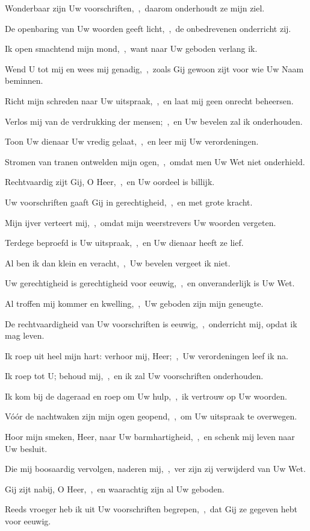 \documentclass[12pt,twoside,a5paper]{article}
\begin{document}
\begin{halfparskip}
   Wonderbaar zijn Uw voorschriften,~\sep\ daarom onderhoudt ze mijn ziel.

  De openbaring van Uw woorden geeft licht,~\sep\ de onbedrevenen onderricht zij.

  Ik open smachtend mijn mond,~\sep\ want naar Uw geboden verlang ik.

  Wend U tot mij en wees mij genadig,~\sep\ zoals Gij gewoon zijt voor wie Uw Naam beminnen.

  Richt mijn schreden naar Uw uitspraak,~\sep\ en laat mij geen onrecht beheersen.

  Verlos mij van de verdrukking der mensen;~\sep\ en Uw bevelen zal ik onderhouden.

  Toon Uw dienaar Uw vredig gelaat,~\sep\ en leer mij Uw verordeningen.

  Stromen van tranen ontwelden mijn ogen,~\sep\ omdat men Uw Wet niet onderhield.
\end{halfparskip}

\begin{halfparskip}
   Rechtvaardig zijt Gij, O Heer,~\sep\ en Uw oordeel is billijk.

  Uw voorschriften gaaft Gij in gerechtigheid,~\sep\ en met grote kracht.

  Mijn ijver verteert mij,~\sep\ omdat mijn weerstrevers Uw woorden vergeten.

  Terdege beproefd is Uw uitspraak,~\sep\ en Uw dienaar heeft ze lief.

  Al ben ik dan klein en veracht,~\sep\ Uw bevelen vergeet ik niet.

  Uw gerechtigheid is gerechtigheid voor eeuwig,~\sep\ en onveranderlijk is Uw Wet.

  Al troffen mij kommer en kwelling,~\sep\ Uw geboden zijn mijn geneugte.

  De rechtvaardigheid van Uw voorschriften is eeuwig,~\sep\ onderricht mij, opdat ik mag leven.
\end{halfparskip}

\begin{halfparskip}
   Ik roep uit heel mijn hart: verhoor mij, Heer;~\sep\ Uw verordeningen leef ik na.

  Ik roep tot U; behoud mij,~\sep\ en ik zal Uw voorschriften onderhouden.

  Ik kom bij de dageraad en roep om Uw hulp,~\sep\ ik vertrouw op Uw woorden.

  Vóór de nachtwaken zijn mijn ogen geopend,~\sep\ om Uw uitspraak te overwegen.

  Hoor mijn smeken, Heer, naar Uw barmhartigheid,~\sep\ en schenk mij leven naar Uw besluit.

  Die mij boosaardig vervolgen, naderen mij,~\sep\ ver zijn zij verwijderd van Uw Wet.

  Gij zijt nabij, O Heer,~\sep\ en waarachtig zijn al Uw geboden.

  Reeds vroeger heb ik uit Uw voorschriften begrepen,~\sep\ dat Gij ze gegeven hebt voor eeuwig.
\end{halfparskip}
\end{document}
